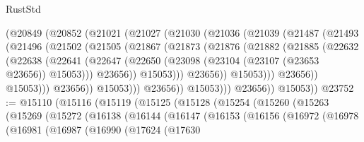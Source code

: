 \begin{lexlean}{RustStd}
\begin{coremodule}
                    (@20849
                      (@20852
                        (@21021
                          (@21027
                            (@21030
                              (@21036
                                (@21039
                                  (@21487
                                    (@21493
                                      (@21496
                                        (@21502
                                          (@21505
                                            (@21867
                                              (@21873
                                                (@21876
                                                  (@21882
                                                    (@21885
                                                      (@22632
                                                        (@22638
                                                          (@22641
                                                            (@22647
                                                              (@22650
                                                                (@23098
                                                                  (@23104
                                                                    (@23107 (@23653 @23656))
                                                                    @15053)))
                                                              @23656))
                                                          @15053)))
                                                    @23656))
                                                @15053)))
                                          @23656))
                                      @15053)))
                                @23656))
                            @15053)))
                      @23656))
                  @15053)))
            @23656))
        @15053))
@23752 := @15110
    (@15116
      (@15119
        (@15125
          (@15128
            (@15254
              (@15260
                (@15263
                  (@15269
                    (@15272
                      (@16138
                        (@16144
                          (@16147
                            (@16153
                              (@16156
                                (@16972
                                  (@16978
                                    (@16981
                                      (@16987
                                        (@16990
                                          (@17624
                                            (@17630

\end{coremodule}
\end{lexlean}

